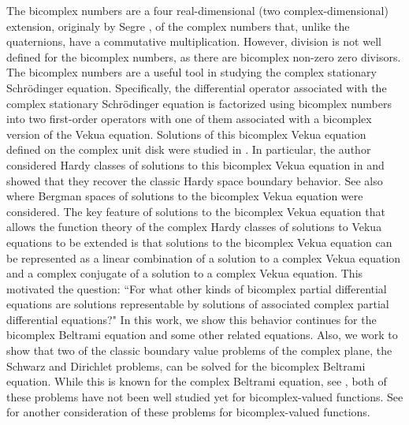 \documentclass[12pt,reqno]{amsart}
\theoremstyle{definition}
\theoremstyle{remark}
\begin{document}
    The bicomplex numbers are a four real-dimensional (two complex-dimensional) extension, originaly by Segre \cite{Segre}, of the complex numbers that, unlike the quaternions, have a commutative multiplication. However, division is not well defined for the bicomplex numbers, as there are bicomplex non-zero zero divisors. The bicomplex numbers are a useful tool in studying the complex stationary Schr\"odinger equation. Specifically, the differential operator  associated with the complex stationary Schr\"odinger equation is factorized using bicomplex numbers into two first-order operators with one of them associated with a bicomplex version of the Vekua equation. Solutions of this bicomplex Vekua equation defined on the complex unit disk were studied in \cite{CastaKrav, FundBicomplex, KravAPFT, ComplexSchr}. In particular, the author considered Hardy classes of solutions to this bicomplex Vekua equation in \cite{BCHoiv} and showed that they recover the classic Hardy space boundary behavior. See also \cite{BCTransmutation, BCBergman} where Bergman spaces of solutions to the bicomplex Vekua equation were considered. The key feature of solutions to the bicomplex Vekua equation that allows the function theory of the complex Hardy classes of solutions to Vekua equations to be extended is that solutions to the bicomplex Vekua equation can be represented as a linear combination of a solution to a complex Vekua equation and a complex conjugate of a solution to a complex Vekua equation. This motivated the question: ``For what other kinds of bicomplex partial differential equations are solutions representable by solutions of associated complex partial differential equations?" In this work, we show this behavior continues for the bicomplex Beltrami equation and some other related equations. Also, we work to show that two of the classic boundary value problems of the complex plane, the Schwarz and Dirichlet problems, can be solved for the bicomplex Beltrami equation. While this is known for the complex Beltrami equation, see \cite{BeltramiSchwarz}, both of these problems have not been well studied yet for bicomplex-valued functions. See \cite{BCSchwarz} for another consideration of these problems for bicomplex-valued functions.
\end{document}

